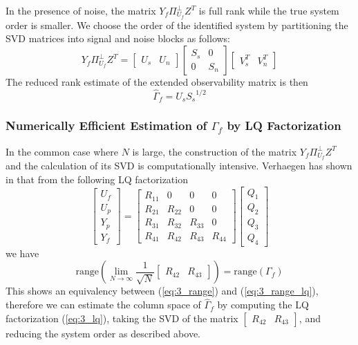 In the presence of noise, the matrix $Y_f\Pi_{U_f}^\perp Z^T$ is full rank while the true system order is smaller. We choose the order of the identified system by partitioning the SVD matrices into signal and noise blocks as follows:
\begin{equation*}
Y_f\Pi_{U_f}^\perp Z^T = 
\begin{bmatrix}U_s & U_n\end{bmatrix}
\begin{bmatrix}S_s & 0\\ 0 & S_n\end{bmatrix}
\begin{bmatrix}V_s^T & V_n^T\end{bmatrix}
\end{equation*}
The reduced rank estimate of the extended observability matrix is then
\begin{equation}
\hat{\Gamma}_f = U_s {S_s}^{1/2}
\end{equation}

\subsubsection*{Numerically Efficient Estimation of $\Gamma_f$ by LQ Factorization}
In the common case where $N$ is large, the construction of the matrix $Y_f\Pi_{U_f}^\perp Z^T$ and the calculation of its SVD is computationally intensive. Verhaegen has shown in \cite{verhaegen1994identification} that from the following LQ factorization
\begin{equation}\label{eq:3_lq}
\begin{bmatrix}U_f\\ U_p\\ Y_p\\ Y_f\end{bmatrix} = 
\begin{bmatrix}
	R_{11} & 0 & 0 & 0\\
	R_{21} & R_{22} & 0 & 0\\
	R_{31} & R_{32} & R_{33} & 0\\
	R_{41} & R_{42} & R_{43} & R_{44}
\end{bmatrix}
\begin{bmatrix}Q_1\\ Q_2\\ Q_3\\ Q_4\end{bmatrix}
\end{equation}
we have
\begin{equation}\label{eq:3_range_lq}
\mbox{range}\left(\lim_{N\rightarrow\infty} \frac{1}{\sqrt{N}} \begin{bmatrix}R_{42} & R_{43}\end{bmatrix}\right) = \mbox{range}\left(\Gamma_f\right)
\end{equation}
This shows an equivalency between (\ref{eq:3_range}) and (\ref{eq:3_range_lq}), therefore we can estimate the column space of $\hat{\Gamma}_f$ by computing the LQ factorization (\ref{eq:3_lq}), taking the SVD of the matrix $\begin{bmatrix}R_{42} & R_{43}\end{bmatrix}$, and reducing the system order as described above.



